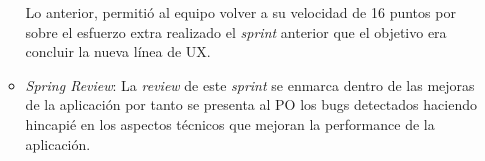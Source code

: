\begin{itemize}
\begin{itemize}
Lo anterior, permitió al equipo volver a su velocidad de 16 puntos por sobre el esfuerzo extra realizado el \textit{sprint} anterior que el objetivo era concluir la nueva línea de UX.

\item \textit{Spring Review}: La \textit{review} de este \textit{sprint} se enmarca dentro de las mejoras de la aplicación por tanto se presenta al PO los bugs detectados haciendo hincapié en los aspectos técnicos que mejoran la performance de la aplicación.

\end{itemize}

\end{itemize}

